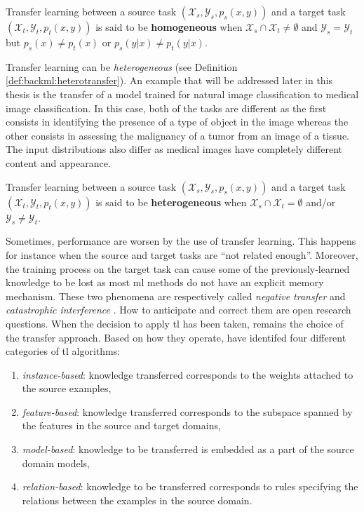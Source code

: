 \begin{definition}
\label{def:backml:homotransfer}
Transfer learning between a source task $\left(\mathcal{X}_{s}, \mathcal{Y}_{s}, p_{s}(x, y)\right)$ and a target task $\left(\mathcal{X}_t, \mathcal{Y}_t, p_t(x, y)\right)$ is said to be \textbf{homogeneous} when $\mathcal{X}_s \cap \mathcal{X}_t \neq \emptyset$ and $\mathcal{Y}_s = \mathcal{Y}_t$ but $p_s(x) \neq p_t(x)$ or $p_s(y|x) \neq p_t(y|x)$. 
\end{definition}

Transfer learning can be \textit{heterogeneous} (see Definition \ref{def:backml:heterotransfer}). An example that will be addressed later in this thesis is the transfer of a model trained for natural image classification to medical image classification. In this case, both of the tasks are different as the first consists in identifying the presence of a type of object in the image whereas the other consists in assessing the malignancy of a tumor from an image of a tissue. The input distributions also differ as medical images have completely different content and appearance.  

\begin{definition}
\label{def:backml:heterotransfer}
Transfer learning between a source task $\left(\mathcal{X}_{s}, \mathcal{Y}_{s}, p_{s}(x, y)\right)$ and a target task $\left(\mathcal{X}_t, \mathcal{Y}_t, p_t(x, y)\right)$ is said to be \textbf{heterogeneous} when $\mathcal{X}_s \cap \mathcal{X}_t = \emptyset$ and/or $\mathcal{Y}_s \neq \mathcal{Y}_t$.
\end{definition}

Sometimes, performance are worsen by the use of transfer learning. This happens for instance when the source and target tasks are ``not related enough''. Moreover, the training process on the target task can cause some of the previously-learned knowledge to be lost as most \acrlong{ml} methods do not have an explicit memory mechanism. These two phenomena are respectively called \textit{negative transfer} \parencite{zhang2020overcoming} and \textit{catastrophic interference} \parencite{french1999catastrophic}. How to anticipate and correct them are open research questions. When the decision to apply \acrlong{tl} has been taken, remains the choice of the transfer approach. Based on how they operate, \parencite{yang2020transfer} have identifed four different categories of \acrlong{tl} algorithms: 

\begin{enumerate}
  \item \textit{instance-based}: knowledge transferred corresponds to the weights attached to the source examples,
  \item \textit{feature-based}: knowledge transferred corresponds to the subspace spanned by the features in the source and target domains,
  \item \textit{model-based}: knowledge to be transferred is embedded as a part of the source domain models,
  \item \textit{relation-based}: knowledge to be transferred corresponds to rules specifying the relations between the examples in the source domain. 
\end{enumerate}

